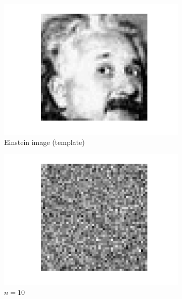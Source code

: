 \documentclass[english,11pt]{article}
\numberwithin{equation}{section}
\theoremstyle{plain}
\theoremstyle{definition}
\theoremstyle{remark}
\theoremstyle{plain}
\theoremstyle{remark}
\theoremstyle{plain}
\theoremstyle{plain}
\begin{document}
\begin{figure}[h!]
	\centering
	\begin{subfigure}[h]{0.3\textwidth}
		\centering
		\includegraphics[scale=0.3]{Einstein}
		\caption{\label{fig:Einstein}Einstein image (template)}
	\end{subfigure}%
	\begin{subfigure}[h]{0.3\textwidth}
		\centering
		\includegraphics[scale=0.3]{Einstein_from_noise_n10}
		\caption{$n = 10$}
	\end{subfigure}
	\begin{subfigure}[h]{0.3\textwidth}
		\centering

\end{subfigure}
\end{figure}
\end{document}
